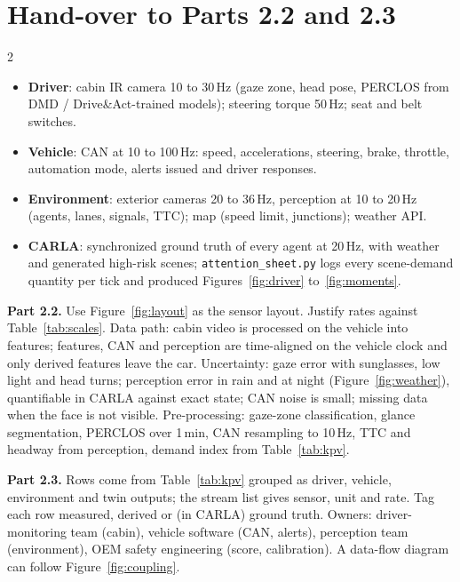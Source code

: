 \documentclass[10pt]{article}
\begin{document}
\section{Hand-over to Parts 2.2 and 2.3}
\begin{multicols}{2}\footnotesize
\begin{itemize}
\item \textbf{Driver}: cabin IR camera 10 to 30\,Hz (gaze zone, head pose, PERCLOS from DMD / Drive\&Act-trained models); steering torque 50\,Hz; seat and belt switches.
\item \textbf{Vehicle}: CAN at 10 to 100\,Hz: speed, accelerations, steering, brake, throttle, automation mode, alerts issued and driver responses.
\item \textbf{Environment}: exterior cameras 20 to 36\,Hz, perception at 10 to 20\,Hz (agents, lanes, signals, TTC); map (speed limit, junctions); weather API.
\item \textbf{CARLA}: synchronized ground truth of every agent at 20\,Hz, with weather and generated high-risk scenes; \texttt{attention\_sheet.py} logs every scene-demand quantity per tick and produced Figures~\ref{fig:driver} to~\ref{fig:moments}.
\end{itemize}
\end{multicols}
\vspace{-8pt}
{\small
\noindent\textbf{Part 2.2.} Use Figure~\ref{fig:layout} as the sensor layout. Justify rates against Table~\ref{tab:scales}. Data path: cabin video is processed on the vehicle into features; features, CAN and perception are time-aligned on the vehicle clock and only derived features leave the car. Uncertainty: gaze error with sunglasses, low light and head turns; perception error in rain and at night (Figure~\ref{fig:weather}), quantifiable in CARLA against exact state; CAN noise is small; missing data when the face is not visible. Pre-processing: gaze-zone classification, glance segmentation, PERCLOS over 1\,min, CAN resampling to 10\,Hz, TTC and headway from perception, demand index from Table~\ref{tab:kpv}.

\noindent\textbf{Part 2.3.} Rows come from Table~\ref{tab:kpv} grouped as driver, vehicle, environment and twin outputs; the stream list gives sensor, unit and rate. Tag each row measured, derived or (in CARLA) ground truth. Owners: driver-monitoring team (cabin), vehicle software (CAN, alerts), perception team (environment), OEM safety engineering (score, calibration). A data-flow diagram can follow Figure~\ref{fig:coupling}.\par}
\end{document}

